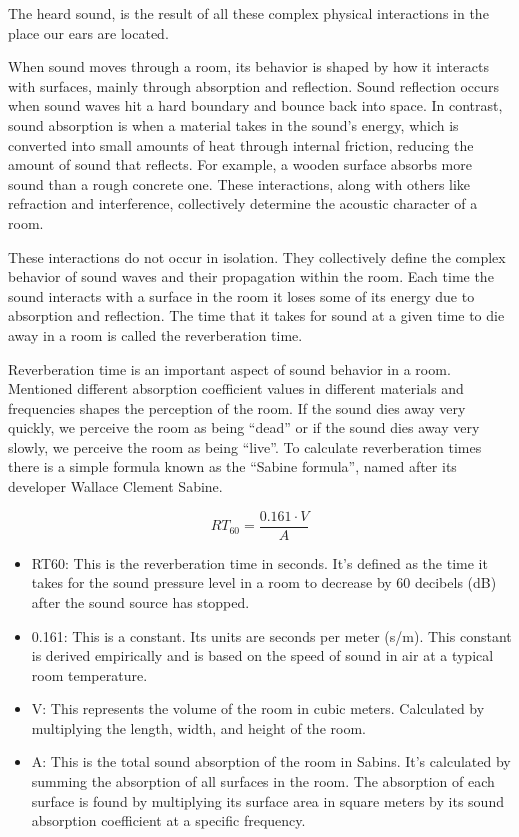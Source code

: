             The heard sound, is the result of all these complex physical interactions in the place our ears are located.\par

            When sound moves through a room, its behavior is shaped by how it interacts with surfaces, mainly through absorption and reflection. Sound reflection occurs when sound waves hit a hard boundary and bounce back into space. In contrast, sound absorption is when a material takes in the sound's energy, which is converted into small amounts of heat through internal friction, reducing the amount of sound that reflects\cite{Blank}. For example, a wooden surface absorbs more sound than a rough concrete one. These interactions, along with others like refraction and interference, collectively determine the acoustic character of a room.\par

            These interactions do not occur in isolation. They collectively define the complex behavior of sound waves and their propagation within the room. Each time the sound interacts with a surface in the room it loses some of its energy due to absorption and reflection. The time that it takes for sound at a given time to die away in a room is called the reverberation time.\par

            Reverberation time is an important aspect of sound behavior in a room. Mentioned different absorption coefficient values in different materials and frequencies shapes the perception of the room. If the sound dies away very quickly, we perceive the room as being “dead” or if the sound dies away very slowly, we perceive the room as being “live”. To calculate reverberation times there is a simple formula known as the “Sabine formula”, named after its developer Wallace Clement Sabine\cite{Blank}.\par 
            $$RT_{60} = \frac{0.161 \cdot V}{A}$$
            \begin{itemize}
                \item RT60: This is the reverberation time in seconds. It's defined as the time it takes for the sound pressure level in a room to decrease by 60 decibels (dB) after the sound source has stopped.
                \item 0.161: This is a constant. Its units are seconds per meter (s/m). This constant is derived empirically and is based on the speed of sound in air at a typical room temperature.
                \item V: This represents the volume of the room in cubic meters. Calculated by multiplying the length, width, and height of the room.
                \item A: This is the total sound absorption of the room in Sabins. It's calculated by summing the absorption of all surfaces in the room. The absorption of each surface is found by multiplying its surface area in square meters by its sound absorption coefficient at a specific frequency.
            \end{itemize}

